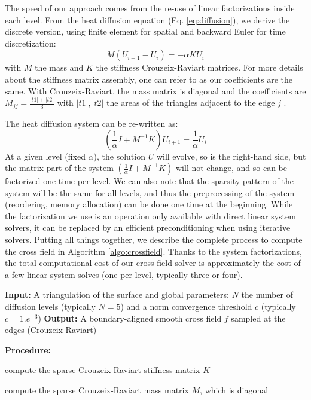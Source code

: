 \documentclass[AMA,STIX1COL]{WileyNJD-v2}
\begin{document}
{The speed of our approach comes from the re-use of linear factorizations inside each
level. From the heat diffusion equation (Eq. \ref{eq:diffusion}),
we derive the discrete version, using finite element for spatial and backward Euler for time discretization:
$$ M (U_{i+1} - U_{i}) = - \alpha K U_{i} $$
with $M$ the mass and $K$ the stiffness Crouzeix-Raviart matrices. For more
details about the stiffness matrix assembly, one can refer to \cite{beaufort2017} as our
coefficients are the same. With Crouzeix-Raviart, the mass matrix is diagonal
and the coefficients are $M_{jj} = \frac{|t1| + |t2|}{3}$ with $|t1|,|t2|$ the
areas of the triangles adjacent to the edge $j$ \cite{wardetzky2007}.

The heat diffusion system can be re-written as:
$$ (\frac{1}{\alpha} I + M^{-1} K) U_{i+1} = \frac{1}{\alpha} U_{i} $$
At a given level (fixed $\alpha$), the solution $U$ will evolve, so is the
right-hand side, but the matrix part of the system $(\frac{1}{\alpha} I +
M^{-1} K)$ will not change, and so can be factorized one time per level. We can
also note that the sparsity pattern of the system will be the same for all
levels, and thus the preprocessing of the system (reordering, memory
allocation) can be done one time at the beginning.
While the factorization we use is an operation only available with direct
linear system solvers, it can be replaced by an efficient preconditioning when
using iterative solvers.
Putting all things together, we describe the complete process to compute the cross
field in Algorithm \ref{algo:crossfield}. Thanks to the system factorizations,
the total computational cost of our cross field solver is approximately the cost
of a few linear system solves (one per level, typically three or four).

\begin{algorithm}
\caption{Fast heat-based computation of cross field}
\begin{algorithmic}

\State \textbf{Input:} A triangulation of the surface and global parameters:
       $N$ the number of diffusion levels (typically $N=5$) and a norm convergence threshold $c$ (typically $c=1.e^{-3}$)
\State \textbf{Output:} A boundary-aligned smooth cross field $f$ sampled at the edges (Crouzeix-Raviart)

\State \textbf{Procedure:}

\State compute the sparse Crouzeix-Raviart stiffness matrix $K$ 

\State compute the sparse Crouzeix-Raviart mass matrix $M$, which is diagonal


\end{algorithmic}
\end{algorithm}}
\end{document}
